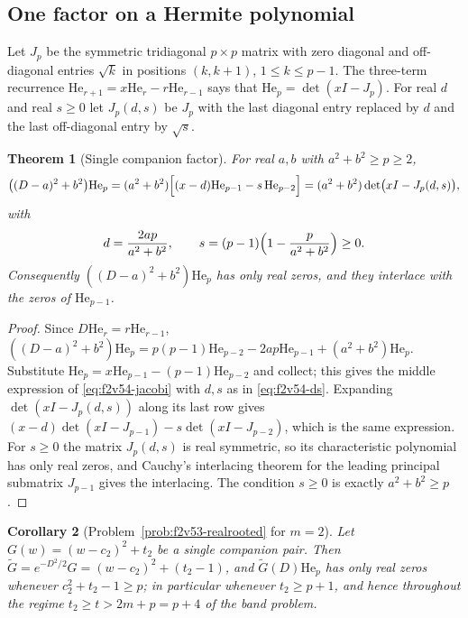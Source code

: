 \documentclass[11pt]{article}
\newtheorem{theorem}{Theorem}[section]
\newtheorem{corollary}[theorem]{Corollary}
\theoremstyle{definition}
\theoremstyle{remark}
\begin{document}
\subsection{One factor on a Hermite polynomial}

Let \(J_p\) be the symmetric tridiagonal \(p\times p\) matrix with zero
diagonal and off-diagonal entries \(\sqrt k\) in positions \((k,k+1)\),
\(1\le k\le p-1\).  The three-term recurrence
\(\mathrm{He}_{r+1}=x\mathrm{He}_r-r\mathrm{He}_{r-1}\) says that
\(\mathrm{He}_p=\det(xI-J_p)\).  For real \(d\) and real \(s\ge0\) let
\(J_p(d,s)\) be \(J_p\) with the last diagonal entry replaced by \(d\)
and the last off-diagonal entry by \(\sqrt s\).

\begin{theorem}[Single companion factor]
\label{thm:f2v54-jacobi}
For real \(a,b\) with \(a^2+b^2\ge p\ge2\),
\begin{equation}
 \bigl((D-a)^2+b^2\bigr)\mathrm{He}_p
 =(a^2+b^2)\Bigl[(x-d)\mathrm{He}_{p-1}-s\,\mathrm{He}_{p-2}\Bigr]
 =(a^2+b^2)\det\bigl(xI-J_p(d,s)\bigr),
 \label{eq:f2v54-jacobi}
\end{equation}
with
\begin{equation}
 d=\frac{2ap}{a^2+b^2},\qquad
 s=(p-1)\Bigl(1-\frac p{a^2+b^2}\Bigr)\ge0 .
 \label{eq:f2v54-ds}
\end{equation}
Consequently \(((D-a)^2+b^2)\mathrm{He}_p\) has only real zeros, and they
interlace with the zeros of \(\mathrm{He}_{p-1}\).
\end{theorem}

\begin{proof}
Since \(D\mathrm{He}_r=r\mathrm{He}_{r-1}\),
\(((D-a)^2+b^2)\mathrm{He}_p
 =p(p-1)\mathrm{He}_{p-2}-2ap\mathrm{He}_{p-1}+(a^2+b^2)\mathrm{He}_p\).
Substitute \(\mathrm{He}_p=x\mathrm{He}_{p-1}-(p-1)\mathrm{He}_{p-2}\) and
collect; this gives the middle expression of \eqref{eq:f2v54-jacobi}
with \(d,s\) as in \eqref{eq:f2v54-ds}.  Expanding
\(\det(xI-J_p(d,s))\) along its last row gives
\((x-d)\det(xI-J_{p-1})-s\det(xI-J_{p-2})\), which is the same
expression.  For \(s\ge0\) the matrix \(J_p(d,s)\) is real symmetric,
so its characteristic polynomial has only real zeros, and Cauchy's
interlacing theorem for the leading principal submatrix \(J_{p-1}\)
gives the interlacing.  The condition \(s\ge0\) is exactly
\(a^2+b^2\ge p\).
\end{proof}

\begin{corollary}[Problem~\ref{prob:f2v53-realrooted} for \(m=2\)]
\label{cor:f2v54-m2}
Let \(G(w)=(w-c_2)^2+t_2\) be a single companion pair.  Then
\(\widetilde G=e^{-D^2/2}G=(w-c_2)^2+(t_2-1)\), and
\(\widetilde G(D)\mathrm{He}_p\) has only real zeros whenever
\(c_2^2+t_2-1\ge p\); in particular whenever \(t_2\ge p+1\), and hence
throughout the regime \(t_2\ge t>2m+p=p+4\) of the band problem.
\end{corollary}
\end{document}
